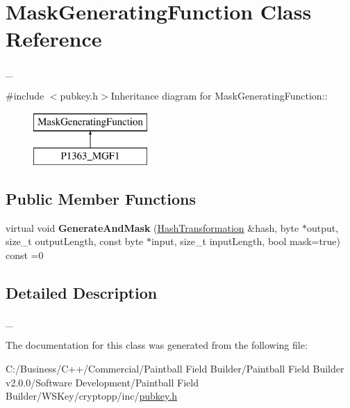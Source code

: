 \hypertarget{class_mask_generating_function}{
\section{MaskGeneratingFunction Class Reference}
\label{class_mask_generating_function}
}


\_\-  


{\ttfamily \#include $<$pubkey.h$>$}Inheritance diagram for MaskGeneratingFunction::\begin{figure}[H]
\begin{center}
\leavevmode
\includegraphics[height=2cm]{class_mask_generating_function}
\end{center}
\end{figure}
\subsection*{Public Member Functions}
\begin{DoxyCompactItemize}
\item 
\hypertarget{class_mask_generating_function_a7ef49cae6b047a6be64909d63cfa41ba}{
virtual void {\bfseries GenerateAndMask} (\hyperlink{class_hash_transformation}{HashTransformation} \&hash, byte $\ast$output, size\_\-t outputLength, const byte $\ast$input, size\_\-t inputLength, bool mask=true) const =0}
\label{class_mask_generating_function_a7ef49cae6b047a6be64909d63cfa41ba}

\end{DoxyCompactItemize}


\subsection{Detailed Description}
\_\- 

The documentation for this class was generated from the following file:\begin{DoxyCompactItemize}
\item 
C:/Business/C++/Commercial/Paintball Field Builder/Paintball Field Builder v2.0.0/Software Development/Paintball Field Builder/WSKey/cryptopp/inc/\hyperlink{pubkey_8h}{pubkey.h}\end{DoxyCompactItemize}
